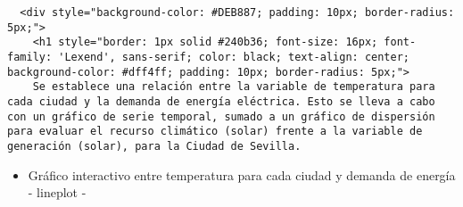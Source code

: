 \documentclass[11pt]{article}
\providecommand{\tightlist}{%
      \setlength{\itemsep}{0pt}\setlength{\parskip}{0pt}}
\begin{document}
    
    
    
    
    
    
    \begin{verbatim}
  <div style="background-color: #DEB887; padding: 10px; border-radius: 5px;">
    <h1 style="border: 1px solid #240b36; font-size: 16px; font-family: 'Lexend', sans-serif; color: black; text-align: center; background-color: #dff4ff; padding: 10px; border-radius: 5px;">
    Se establece una relación entre la variable de temperatura para cada ciudad y la demanda de energía eléctrica. Esto se lleva a cabo con un gráfico de serie temporal, sumado a un gráfico de dispersión para evaluar el recurso climático (solar) frente a la variable de generación (solar), para la Ciudad de Sevilla.
\end{verbatim}

    \begin{itemize}
\tightlist
\item
  Gráfico interactivo entre temperatura para cada ciudad y demanda de
  energía - lineplot -
\end{itemize}
\end{document}

